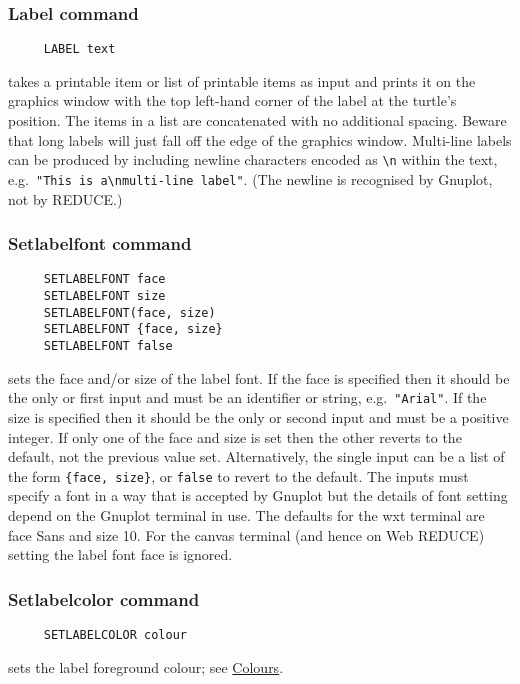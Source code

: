 \subsubsection*{Label command}
\begin{verbatim}
     LABEL text
\end{verbatim}
takes a printable item or list of printable items as input and prints
it on the graphics window with the top left-hand corner of the label
at the turtle's position.  The items in a list are concatenated with
no additional spacing.  Beware that long labels will just fall off the
edge of the graphics window.  Multi-line labels can be produced by
including newline characters encoded as \texttt{\textbackslash n}
within the text, e.g.\ \texttt{"This is a\textbackslash nmulti-line
  label"}.  (The newline is recognised by Gnuplot, not by REDUCE.)

\subsubsection*{Setlabelfont command}
\begin{verbatim}
     SETLABELFONT face
     SETLABELFONT size
     SETLABELFONT(face, size)
     SETLABELFONT {face, size}
     SETLABELFONT false
\end{verbatim}
\label{logoturtle:setlabelfont}
sets the face and/or size of the label font.  If the face is specified
then it should be the only or first input and must be an identifier or
string, e.g.\ \texttt{"Arial"}.  If the size is specified then it
should be the only or second input and must be a positive integer.  If
only one of the face and size is set then the other reverts to the
default, not the previous value set.  Alternatively, the single input
can be a list of the form \texttt{\{face, size\}}, or \texttt{false}
to revert to the default.  The inputs must specify a font in a way
that is accepted by Gnuplot but the details of font setting depend on
the Gnuplot terminal in use.  The defaults for the wxt terminal are
face Sans and size 10.  For the canvas terminal (and hence on Web
REDUCE) setting the label font face is ignored.

\subsubsection*{Setlabelcolor command}
\begin{verbatim}
     SETLABELCOLOR colour
\end{verbatim}
sets the label foreground colour; see
\hyperref[logoturtle:Colours]{Colours}.


